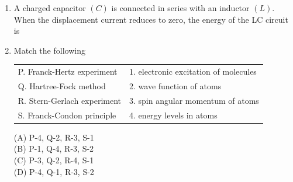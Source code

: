 \documentclass[journal,12pt,onecolumn]{IEEEtran}
\begin{document}
\begin{enumerate}[itemsep = 1em]
\hfill{}


\begin{enumerate}
\end{enumerate}

\item A charged capacitor $(C)$ is connected in series with an inductor $(L)$. When the displacement current reduces to zero, the energy of the LC circuit is

\hfill{}


\begin{enumerate}
\end{enumerate}


    
\item Match the following

\hfill{}

\begin{tabular}{@{}ll}
P. Franck-Hertz experiment & 1. electronic excitation of molecules \\
Q. Hartree-Fock method     & 2. wave function of atoms \\
R. Stern-Gerlach experiment & 3. spin angular momentum of atoms \\
S. Franck-Condon principle & 4. energy levels in atoms
\end{tabular}

\vspace{0.5em}

\begin{multicols}{4}
(A) P-4, Q-2, R-3, S-1 \\
(B) P-1, Q-4, R-3, S-2 \\
(C) P-3, Q-2, R-4, S-1 \\
(D) P-4, Q-1, R-3, S-2
\end{multicols}



\end{enumerate}
\end{document}
